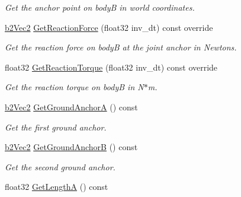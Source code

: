 \begin{DoxyCompactItemize}
\begin{DoxyCompactList}\small\item\em Get the anchor point on bodyB in world coordinates. \end{DoxyCompactList}\item 
\mbox{\label{classb2PulleyJoint_a90904a458169a22fe0a9e2c4f5332101}} 
\hyperlink{structb2Vec2}{b2\+Vec2} \hyperlink{classb2PulleyJoint_a90904a458169a22fe0a9e2c4f5332101}{Get\+Reaction\+Force} (float32 inv\+\_\+dt) const override
\begin{DoxyCompactList}\small\item\em Get the reaction force on bodyB at the joint anchor in Newtons. \end{DoxyCompactList}\item 
\mbox{\label{classb2PulleyJoint_a707bed4e4541d5da58022a6ee2bc58a1}} 
float32 \hyperlink{classb2PulleyJoint_a707bed4e4541d5da58022a6ee2bc58a1}{Get\+Reaction\+Torque} (float32 inv\+\_\+dt) const override
\begin{DoxyCompactList}\small\item\em Get the reaction torque on bodyB in N$\ast$m. \end{DoxyCompactList}\item 
\mbox{\label{classb2PulleyJoint_a082db0a3ab20f682b9c7d5f41f0cc79e}} 
\hyperlink{structb2Vec2}{b2\+Vec2} \hyperlink{classb2PulleyJoint_a082db0a3ab20f682b9c7d5f41f0cc79e}{Get\+Ground\+AnchorA} () const
\begin{DoxyCompactList}\small\item\em Get the first ground anchor. \end{DoxyCompactList}\item 
\mbox{\label{classb2PulleyJoint_afb105270ab46c3fc3f862cab6e127971}} 
\hyperlink{structb2Vec2}{b2\+Vec2} \hyperlink{classb2PulleyJoint_afb105270ab46c3fc3f862cab6e127971}{Get\+Ground\+AnchorB} () const
\begin{DoxyCompactList}\small\item\em Get the second ground anchor. \end{DoxyCompactList}\item 
\mbox{\label{classb2PulleyJoint_ac92d5def8d6d14777b255cbeea6b9c30}} 
float32 \hyperlink{classb2PulleyJoint_ac92d5def8d6d14777b255cbeea6b9c30}{Get\+LengthA} () const

\end{DoxyCompactItemize}
